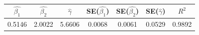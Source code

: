 \begin{tabular}{ccccccc}
\toprule
$\hat{\beta_1}$ & $\hat{\beta_2}$ & $\hat{\gamma}$ & SE($\hat{\beta_1}$) & SE($\hat{\beta_2}$) & SE($\hat{\gamma}$) & $R^2$ \\
\midrule
0.5146 & 2.0022 & 5.6606 & 0.0068 & 0.0061 & 0.0529 & 0.9892 \\
\bottomrule
\end{tabular}